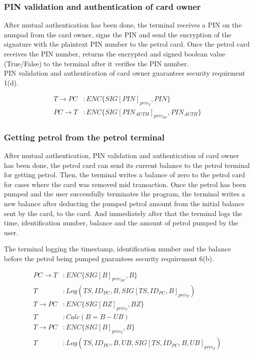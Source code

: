 \subsubsection{PIN validation and authentication of card owner}
After mutual authentication has been done, the terminal receives a PIN on the numpad from the card owner, signs the PIN and send the encryption of the signature with the plaintext PIN number to the petrol card. Once the petrol card receives the PIN number, returns the encrypted and signed boolean value (True/False) to the terminal after it verifies the PIN number. \\

PIN validation and authentication of card owner guarantees security requirment 1(d).

\begin{equation}\nonumber
\begin{split}
T \to PC&: ENC\{SIG[PIN]_{priv_T}, PIN\}\\
PC \to T&: ENC\{SIG[PIN_{AUTH}]_{priv_{PC}}, PIN_{AUTH}\}
\end{split} 
\end{equation}

\subsubsection{Getting petrol from the petrol terminal}
After mutual authentication, PIN validation and authentication of card owner has been done, the petrol card can send its current balance to the petrol terminal for getting petrol. Then, the terminal writes a balance of zero to the petrol card for cases where the card was removed mid transaction. Once the petrol has been pumped and the user successfully terminates the program, the terminal writes a new balance after deducting the pumped petrol amount from the initial balance sent by the card, to the card. And immediately after that the terminal logs the time, identification number, balance and the amount of petrol pumped by the user.

The terminal logging the timestamp, identification number and the balance before the petrol being pumped guarantees security requirement 6(b).

\begin{equation}\nonumber
\begin{split}
PC \to T&: ENC\{SIG[B]_{priv_{PC}}, B\}\\
T&: Log(TS, ID_{PC}, B, SIG[TS, ID_{PC}, B]_{priv_T}) \\
T \to PC&: ENC\{SIG[BZ]_{priv_T}, BZ\}\\
T&: Calc(B = B - UB)\\
T \to PC&: ENC\{SIG[B]_{priv_T}, B\}\\
T&: Log(TS, ID_{PC}, B, UB, SIG[TS, ID_{PC}, B, UB]_{priv_T})
\end{split} 
\end{equation}


